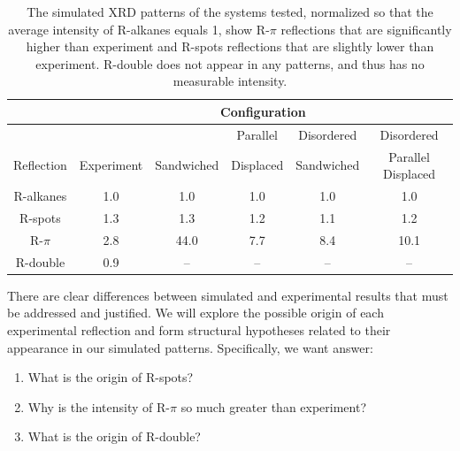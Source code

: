 \documentclass[journal=jpcbfk,manuscript=article]{achemso}
\begin{document}
  \begin{table}[h]
  \centering
  \begin{tabular}{c|ccccc}
  \toprule
 		   & \multicolumn{5}{c}{Configuration} \\
  \hline
             &            &            & Parallel  & Disordered & Disordered         \\
  Reflection & Experiment & Sandwiched & Displaced & Sandwiched & Parallel Displaced \\
  \midrule
  R-alkanes  & 1.0        &  1.0       &  1.0      & 1.0        & 1.0                \\  
  R-spots    & 1.3        &  1.3       &  1.2      & 1.1        & 1.2                \\
  R-$\pi$    & 2.8        & 44.0       &  7.7      & 8.4        & 10.1               \\
  R-double   & 0.9        &  --        & --        &  --        & --                 \\ 
  \bottomrule
  \end{tabular}
  \caption{The simulated XRD patterns of the systems tested, normalized so that the average 
  intensity of R-alkanes equals 1, show R-$\pi$ reflections that are significantly higher 
  than experiment and R-spots reflections that are slightly lower than experiment. R-double
  does not appear in any patterns, and thus has no measurable intensity.}
  \label{table:relative_inensities_300K} 
  \end{table}
  There are clear differences between simulated and experimental results that must be addressed
  and justified. We will explore the possible origin of each experimental reflection and form 
  structural hypotheses related to their appearance in our simulated patterns. Specifically, we 
  want answer:  
  \begin{enumerate}
	\item What is the origin of R-spots?
  	\item Why is the intensity of R-$\pi$ so much greater than experiment?
  	\item What is the origin of R-double?
  \end{enumerate}
  
\end{document}

